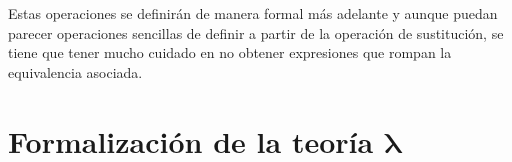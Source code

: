 Estas operaciones se definirán de manera formal más adelante y aunque puedan
parecer operaciones sencillas de definir a partir de la operación de
sustitución, se tiene que tener mucho cuidado en no obtener expresiones que
rompan la equivalencia asociada.

\section{Formalización de la teoría \texorpdfstring{$\boldsymbol\lambda$}{lambda}}


